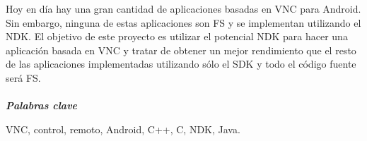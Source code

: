 
Hoy en día hay una gran cantidad de aplicaciones basadas en VNC para Android. Sin embargo, ninguna de estas aplicaciones son FS y se implementan utilizando el NDK. El objetivo de este proyecto es utilizar el potencial NDK para hacer una aplicación basada en VNC y tratar de obtener un mejor rendimiento que el resto de las aplicaciones implementadas utilizando sólo el SDK y todo el código fuente será FS.
\\ \mbox{ } \\
\textit{\textbf{Palabras clave}}

VNC, control, remoto, Android, C++, C, NDK, Java.
